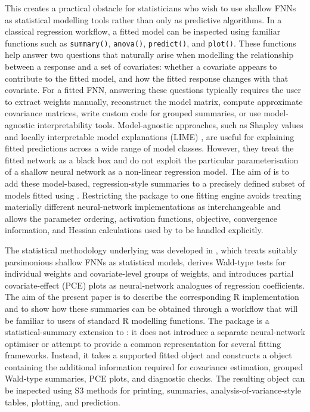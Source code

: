 This creates a practical obstacle for statisticians who wish to use shallow FNNs as statistical modelling tools rather than only as predictive algorithms.
In a classical regression workflow, a fitted model can be inspected using familiar functions such as \texttt{summary()}, \texttt{anova()}, \texttt{predict()}, and \texttt{plot()}.
These functions help answer two questions that naturally arise when modelling the relationship between a response and a set of covariates: whether a covariate appears to contribute to the fitted model, and how the fitted response changes with that covariate.
For a fitted FNN, answering these questions typically requires the user to extract weights manually, reconstruct the model matrix, compute approximate covariance matrices, write custom code for grouped summaries, or use model-agnostic interpretability tools.
Model-agnostic approaches, such as Shapley values \citep{strumbelj2010efficient} and locally interpretable model explanations (LIME) \citep{ribeiro2016lime}, are useful for explaining fitted predictions across a wide range of model classes.
However, they treat the fitted network as a black box and do not exploit the particular parameterisation of a shallow neural network as a non-linear regression model.
The aim of  is to add these model-based, regression-style summaries to a precisely defined subset of models fitted using .
Restricting the package to one fitting engine avoids treating materially different neural-network implementations as interchangeable and allows the parameter ordering, activation functions, objective, convergence information, and Hessian calculations used by  to be handled explicitly.

The statistical methodology underlying  was developed in \citet{mcinerney2023feedforward}, which treats suitably parsimonious shallow FNNs as statistical models, derives Wald-type tests for individual weights and covariate-level groups of weights, and introduces partial covariate-effect (PCE) plots as neural-network analogues of regression coefficients.
The aim of the present paper is to describe the corresponding R implementation and to show how these summaries can be obtained through a workflow that will be familiar to users of standard R modelling functions.
The  package is a statistical-summary extension to : it does not introduce a separate neural-network optimiser or attempt to provide a common representation for several fitting frameworks.
Instead, it takes a supported fitted  object and constructs a  object containing the additional information required for covariance estimation, grouped Wald-type summaries, PCE plots, and diagnostic checks.
The resulting object can be inspected using S3 methods for printing, summaries, analysis-of-variance-style tables, plotting, and prediction.

